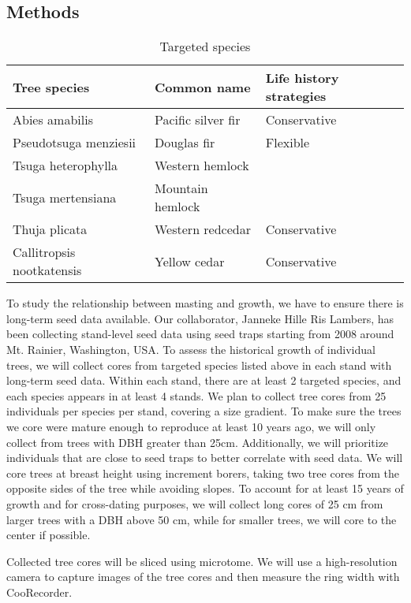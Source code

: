 \documentclass[12pt,letter]{article}
\begin{document}
\subsection{Methods}
\begin{table}[htb]
	\centering
	\small
	\caption{Targeted species}
\begin{tabular}{|p{5cm}|p{5cm}|p{5cm}|}
\hline
 Tree species & Common name & Life history strategies\\ \hline
Abies amabilis & Pacific silver fir & Conservative \\ \hline
Pseudotsuga menziesii & Douglas fir & Flexible    \\\hline
Tsuga heterophylla & Western hemlock &     \\\hline
Tsuga mertensiana & Mountain hemlock &     \\\hline
Thuja plicata & Western redcedar & Conservative    \\\hline
Callitropsis nootkatensis & Yellow cedar & Conservative    \\\hline

\end{tabular}

\end{table}
To study the relationship between masting and growth, we have to ensure there is long-term seed data available. Our collaborator, Janneke Hille Ris Lambers, has been collecting stand-level seed data using seed traps starting from 2008 around Mt. Rainier, Washington, USA. To assess the historical growth of individual trees, we will collect cores from targeted species listed above in each stand with long-term seed data. Within each stand, there are at least 2 targeted species, and each species appears in at least 4 stands. We plan to collect tree cores from 25 individuals per species per stand, covering a size gradient. To make sure the trees we core were mature enough to reproduce at least 10 years ago, we will only collect from trees with DBH greater than 25cm. Additionally, we will prioritize individuals that are close to seed traps to better correlate with seed data. We will core trees at breast height using increment borers, taking two tree cores from the opposite sides of the tree while avoiding slopes. To account for at least 15 years of growth and for cross-dating purposes, we will collect long cores of 25 cm from larger trees with a DBH above 50 cm, while for smaller trees, we will core to the center if possible.

Collected tree cores will be sliced using microtome. We will use a high-resolution camera to capture images of the tree cores and then measure the ring width with CooRecorder.
\end{document}

